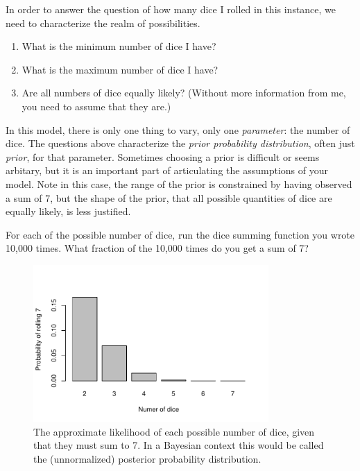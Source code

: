 \documentclass[a4paper,10pt]{article}
\begin{document}
In order to answer the question of how many dice I rolled in this instance, we need to characterize the realm of possibilities.

\begin{enumerate}
 \item What is the minimum number of dice I have?
 \item What is the maximum number of dice I have?
 \item Are all numbers of dice equally likely? (Without more information from me, you need to assume that they are.)
\end{enumerate}

In this model, there is only one thing to vary, only one \textit{parameter}: the number of dice. The questions above characterize the \textit{prior probability distribution}, often just \textit{prior}, for that parameter.  Sometimes choosing a prior is difficult or seems arbitary, but it is an important part of articulating the assumptions of your model.  Note in this case, the range of the prior is constrained by having observed a sum of 7, but the shape of the prior, that all possible quantities of dice are equally likely, is less justified.

For each of the possible number of dice, run the dice summing function you wrote 10,000 times.  What fraction of the 10,000 times do you get a sum of 7?

% 
% 

\begin{figure}[h]
 \centering
 \includegraphics[width=0.80\textwidth]{./simple_roll.pdf}
 \caption{The approximate likelihood of each possible number of dice, given that they must sum to 7.  In a Bayesian context this would be called the (unnormalized) posterior probability distribution.}
 \label{fig:dice_likelihood}
\end{figure}
\end{document}
